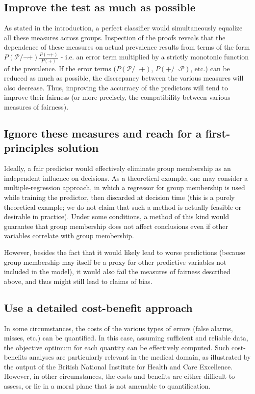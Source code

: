 \documentclass[twocolumn]{article}
\begin{document}
\subsection{Improve the test as much as possible}

As stated in the introduction, a perfect classifier would simultaneously equalize all these measures across groups. Inspection of the proofs reveals that the dependence of these measures on actual prevalence results from terms of the form  $P(\mathcal{P} / \neg +) \frac{P(\neg +)}{P(+)}$ - i.e. an error term multiplied by a strictly monotonic function of the prevalence. If the error terms ($P(\mathcal{P} / \neg +)$, $P(+ / \neg \mathcal{P})$, etc.) can be reduced as much as possible, the discrepancy between the various measures will also decrease. Thus, improving the accurracy of the predictors will tend to improve their fairness (or more precisely, the compatibility between various measures of fairness).

\subsection{Ignore these measures and reach for a first-principles solution}

Ideally, a fair predictor would
effectively eliminate group membership as an independent influence on decisions. As a theoretical example, one may consider a multiple-regression approach, in which a
regressor for group membership is used while training the predictor, then
discarded at decision time (this is a purely theoretical example; we do not
claim that such a method is actually feasible or desirable in practice). Under some conditions, a method of this
kind would guarantee that group membership does not affect conclusions
even if other variables correlate with group membership. 

However, besides the fact that it would likely lead to worse
predictions (because group membership may itself be a proxy for other
predictive variables not included in the model), it would also fail the
measures of fairness described above, and thus might still lead to claims of bias. 

\subsection{Use a detailed cost-benefit approach}

In some circumstances, the costs of the various types of errors (false alarms,
misses, etc.) can be quantified. In this case, assuming sufficient and
reliable data, the objective optimum for each quantity can be effectively
computed. Such cost-benefits analyses are particularly relevant in the medical
domain, as illustrated by the output of the British National Institute for
Health and Care Excellence. However, in other circumstances, the costs and
benefits are either difficult to assess, or lie in a moral plane that is not
amenable to quantification.
\end{document}
